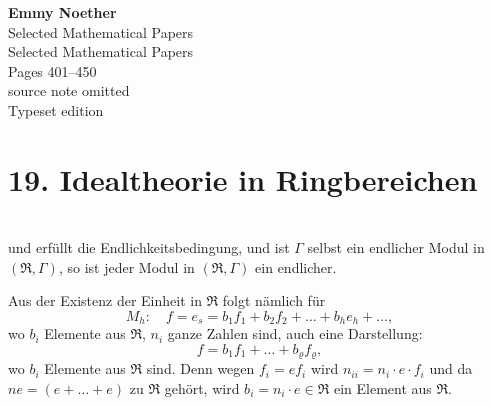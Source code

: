 \documentclass[fontsize=10pt,paper=a5,pagesize,headings=small]{scrbook}
\newcommand{\ring}[1]{\mathfrak{#1}}
\theoremstyle{plain}
\begin{document}
\renewenvironment{noetherpaper}[4]{\newpage\section*{#1}\addcontentsline{toc}{section}{#1}\par\smallskip}{\par\medskip}


\thispagestyle{empty}
\begin{center}
{\LARGE\bfseries Emmy Noether}\\[6pt]
{\Large Selected Mathematical Papers}\\[4pt]
{\large Selected Mathematical Papers}\\[12pt]
{\large Pages 401--450}\\[24pt]
{\small source note omitted}\\[12pt]
{\small Typeset edition}
\end{center}
\newpage

\section*{19. Idealtheorie in Ringbereichen\footnotemark[0]}


\setcounter{page}{401}
\section*{}

und erfüllt die Endlichkeitsbedingung, und ist $\varGamma$ selbst ein endlicher
Modul in $(\ring{R}, \varGamma)$, so ist jeder Modul in $(\ring{R}, \varGamma)$ ein endlicher.

Aus der Existenz der Einheit in $\ring{R}$ folgt nämlich für
\[
M_h\colon\quad f = e_s = b_1 f_1 + b_2 f_2 + \dots + b_h e_h + \dots,
\]
wo $b_i$ Elemente aus $\ring{R}$, $n_i$ ganze Zahlen sind, auch eine Darstellung:
\[ f = b_1 f_1 + \dots + b_\varrho f_\varrho, \]
wo $b_i$ Elemente aus $\ring{R}$ sind. Denn wegen $f_i = ef_i$ wird
$n_{ii} = n_i \cdot e \cdot f_i$ und da $ne = (e + \dots + e)$ zu $\ring{R}$ gehört,
wird $b_i = n_i \cdot e \in \ring{R}$ ein Element aus $\ring{R}$.
\end{document}
